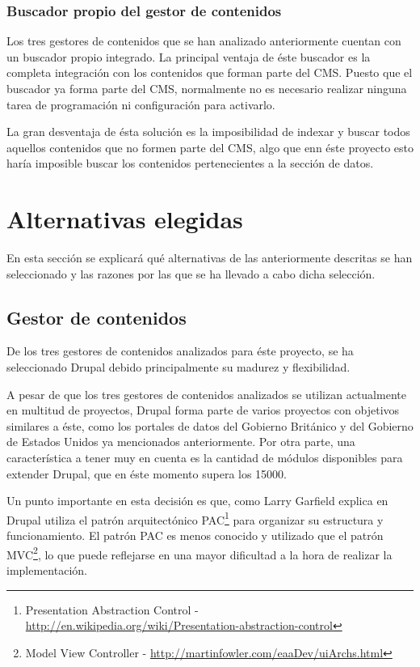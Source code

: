 \subsubsection{Buscador propio del gestor de contenidos}
Los tres gestores de contenidos que se han analizado anteriormente cuentan con un buscador propio integrado.  La principal ventaja de éste buscador es la completa integración con los contenidos que forman parte del CMS.  Puesto que el buscador ya forma parte del CMS, normalmente no es necesario realizar ninguna tarea de programación ni configuración para activarlo.

La gran desventaja de ésta solución es la imposibilidad de indexar y buscar todos aquellos contenidos que no formen parte del CMS,  algo que enn éste proyecto esto haría imposible buscar los contenidos pertenecientes a la sección de datos.



\section{Alternativas elegidas}
\label{chapter02:alternativas_seleccionadas}
En esta sección se explicará qué alternativas de las anteriormente descritas se han seleccionado y las razones por las que se ha llevado a cabo dicha selección.

\subsection{Gestor de contenidos}
De los tres gestores de contenidos analizados para éste proyecto, se ha seleccionado Drupal debido principalmente su madurez y flexibilidad.

A pesar de que los tres gestores de contenidos analizados se utilizan actualmente en multitud de proyectos, Drupal forma parte de varios proyectos con objetivos similares a éste, como los portales de datos del Gobierno Británico y del Gobierno de Estados Unidos ya mencionados anteriormente. Por otra parte, una característica a tener muy en cuenta es la cantidad de módulos disponibles para extender Drupal, que en éste momento supera los 15000.

Un punto importante en esta decisión es que, como Larry Garfield explica en \cite[]{pac-vs-mvc} Drupal utiliza el patrón arquitectónico PAC\footnote{Presentation Abstraction Control - \url{http://en.wikipedia.org/wiki/Presentation-abstraction-control}} para organizar su estructura y funcionamiento.  El patrón PAC es menos conocido y utilizado que el patrón MVC\footnote{Model View Controller - \url{http://martinfowler.com/eaaDev/uiArchs.html}}, lo que puede reflejarse en una mayor dificultad a la hora de realizar la implementación.


